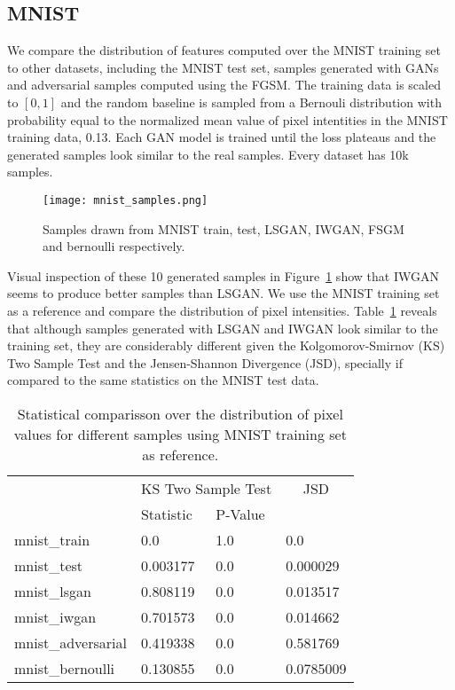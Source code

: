 \subsection{MNIST}
We compare the distribution of features computed over the MNIST training set 
to other datasets, including
the MNIST test set, samples generated with GANs and adversarial samples computed 
using the FGSM. The training data is
scaled to $[0, 1]$ and the random baseline is sampled from a Bernouli distribution with 
probability equal to the normalized mean value of pixel intentities in the
MNIST training data, 0.13. Each GAN model is trained until the loss plateaus 
and the generated samples look similar to the real samples. Every dataset has
10k samples.

\begin{figure}[!h]
  \begin{center}
  \texttt{[image: mnist\_samples.png]}
  \caption{Samples drawn from MNIST train, test,
LSGAN, IWGAN, FSGM and bernoulli respectively.}
  \label{fig:mnist_samples}
  \end{center}
\end{figure}

Visual inspection of these 10 generated samples in
Figure~\ref{fig:mnist_samples} show that IWGAN seems to produce better samples
than LSGAN. We use the MNIST training set as a reference and compare the
distribution of pixel intensities.  Table~\ref{tbl:mnist_pixel} reveals that
although samples generated with LSGAN and IWGAN look similar to the training
set, they are considerably different given the Kolgomorov-Smirnov (KS) Two
Sample Test and the Jensen-Shannon Divergence (JSD), specially if compared to
the same statistics on the MNIST test data. 

\begin{table}[!h]
\centering
\begin{tabular}{l|ll|l|}
                   & \multicolumn{2}{c|}{\cellcolor[HTML]{C0C0C0}KS Two Sample Test} & \multicolumn{1}{c|}{\cellcolor[HTML]{C0C0C0}JSD} \\
                   & Statistic   & P-Value   &                \\
mnist\_train       & 0.0         & 1.0       & 0.0            \\
mnist\_test        & 0.003177    & 0.0       & 0.000029       \\
mnist\_lsgan       & 0.808119    & 0.0       & 0.013517       \\
mnist\_iwgan       & 0.701573    & 0.0       & 0.014662       \\
mnist\_adversarial & 0.419338    & 0.0       & 0.581769       \\
mnist\_bernoulli   & 0.130855    & 0.0       & 0.0785009      
\end{tabular}
\caption{Statistical comparisson over the distribution of pixel values for
different samples using MNIST training set as reference.}
\label{tbl:mnist_pixel}
\end{table}

